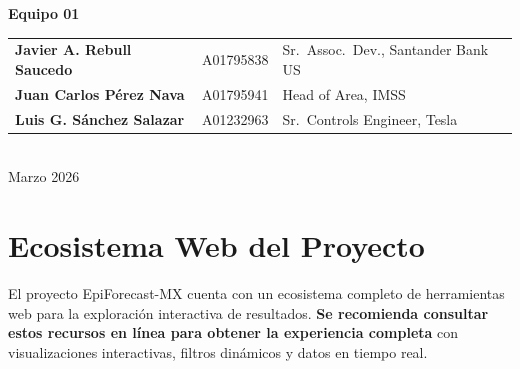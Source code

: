 \documentclass[12pt, letterpaper]{article}
\begin{document}
\begin{titlepage}
\begin{center}
\textbf{\Large Equipo 01}\\[0.4cm]
\begin{tabular}{lll}
\textbf{Javier A. Rebull Saucedo} & A01795838 & Sr.\ Assoc.\ Dev., Santander Bank US \\
\textbf{Juan Carlos Pérez Nava}   & A01795941 & Head of Area, IMSS \\
\textbf{Luis G. Sánchez Salazar}  & A01232963 & Sr.\ Controls Engineer, Tesla \\
\end{tabular}\\[1.0cm]

{\large Marzo 2026}

\end{center}
\end{titlepage}

\newpage
\tableofcontents
\newpage

\section{Ecosistema Web del Proyecto}\label{sec:ecosistema}

El proyecto EpiForecast-MX cuenta con un ecosistema completo de herramientas web para la exploración interactiva de resultados. \textbf{Se recomienda consultar estos recursos en línea para obtener la experiencia completa} con visualizaciones interactivas, filtros dinámicos y datos en tiempo real.
\end{document}
